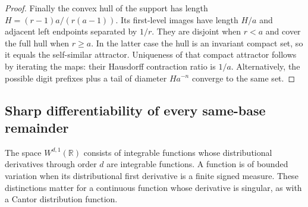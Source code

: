 \documentclass[11pt,a4paper]{article}
\theoremstyle{definition}
\theoremstyle{remark}
\newcommand{\R}{\mathbb R}
\begin{document}
\begin{proof}
Finally the convex hull of the support has length
$H=(r-1)a/(r(a-1))$. Its first-level images have length $H/a$ and adjacent
left endpoints separated by $1/r$. They are disjoint when $r<a$ and
cover the full hull when $r\ge a$. In the latter case the hull is an
invariant compact set, so it equals the self-similar attractor. Uniqueness
of that compact attractor follows by iterating the maps: their Hausdorff
contraction ratio is $1/a$. Alternatively, the possible digit prefixes
plus a tail of diameter $Ha^{-n}$ converge to the same set.
\end{proof}

\subsection{Sharp differentiability of every same-base remainder}
The space $W^{d,1}(\R)$ consists of integrable functions whose distributional
derivatives through order $d$ are integrable functions. A function is of
bounded variation when its distributional first derivative is a finite
signed measure. These distinctions matter for a continuous function whose
derivative is singular, as with a Cantor distribution function.
\end{document}
